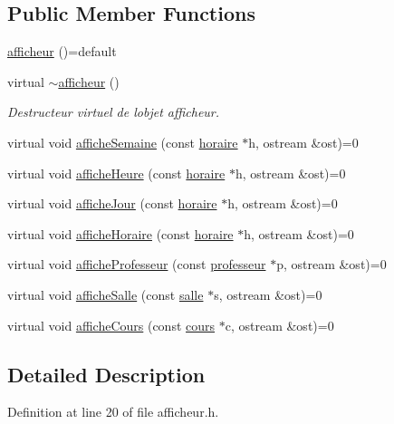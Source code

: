 \subsection*{Public Member Functions}
\begin{DoxyCompactItemize}
\item 
\hyperlink{classafficheur_a6bc02ed7b0dbbb21607528ae03c4f886}{afficheur} ()=default
\item 
virtual \hyperlink{classafficheur_a093c44d15f6de24883abce836bfd11c9}{$\sim$afficheur} ()
\begin{DoxyCompactList}\small\item\em Destructeur virtuel de l\textquotesingle{}objet afficheur. \end{DoxyCompactList}\item 
virtual void \hyperlink{classafficheur_a1551534b5916a48d3ea73f0d68929e95}{affiche\+Semaine} (const \hyperlink{classhoraire}{horaire} $\ast$h, ostream \&ost)=0
\item 
virtual void \hyperlink{classafficheur_a3c3ace0f2f01e95a1cc86a0b6c497e34}{affiche\+Heure} (const \hyperlink{classhoraire}{horaire} $\ast$h, ostream \&ost)=0
\item 
virtual void \hyperlink{classafficheur_a0cea335dad556ceba3487ae261b831f9}{affiche\+Jour} (const \hyperlink{classhoraire}{horaire} $\ast$h, ostream \&ost)=0
\item 
virtual void \hyperlink{classafficheur_aa598626f11775b4c610b8f262017cad7}{affiche\+Horaire} (const \hyperlink{classhoraire}{horaire} $\ast$h, ostream \&ost)=0
\item 
virtual void \hyperlink{classafficheur_a54b3e457d56738ed20641e5546872142}{affiche\+Professeur} (const \hyperlink{classprofesseur}{professeur} $\ast$p, ostream \&ost)=0
\item 
virtual void \hyperlink{classafficheur_af8b1bc89ba8c0f2acdd9a78f97a2949f}{affiche\+Salle} (const \hyperlink{classsalle}{salle} $\ast$s, ostream \&ost)=0
\item 
virtual void \hyperlink{classafficheur_a9d176576ad45c2a07a8a887b853b7edb}{affiche\+Cours} (const \hyperlink{classcours}{cours} $\ast$c, ostream \&ost)=0
\end{DoxyCompactItemize}


\subsection{Detailed Description}


Definition at line 20 of file afficheur.\+h.



